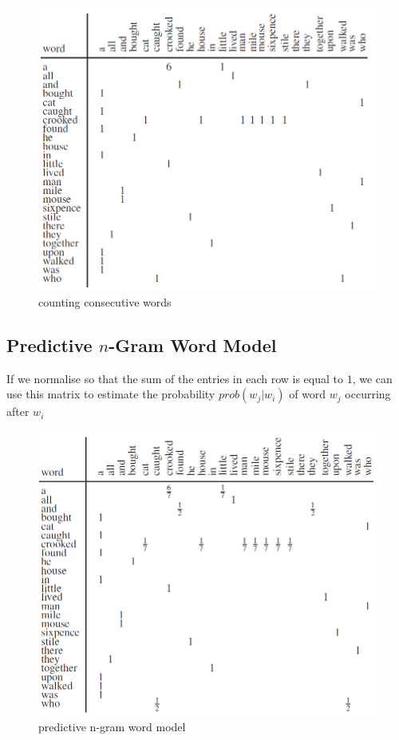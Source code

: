 \documentclass[11pt]{article}
\begin{document}
\begin{figure}[H]
    \centering
    \includegraphics{../out/images/counting-consecutive-words}
    \caption[counting consecutive words]{counting consecutive words}
    \label{fig:counting consecutive words}
\end{figure}

\subsection{Predictive $n$-Gram Word Model}\label{subsec:predictive-$n$-gram-word-model}
If we normalise so that the sum of the entries in each row is equal to $1$, we can use this matrix to estimate the probability $prob(w_j | w_i)$ of word $w_j$ occurring after $w_i$

\begin{figure}[H]
    \centering
    \includegraphics{../out/images/predictive-n-gram-word-model}
    \caption[predictive n-gram word model]{predictive n-gram word model}
    \label{fig:predictive n-gram word model}
\end{figure}
\end{document}
